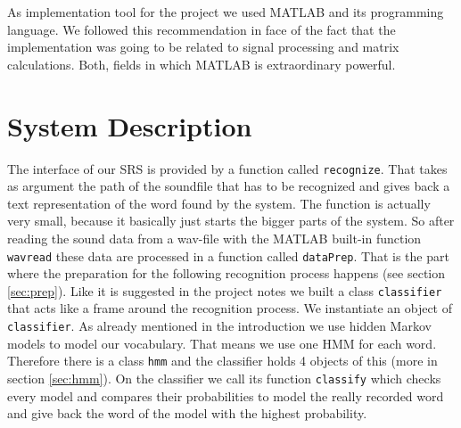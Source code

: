 \documentclass[titlepage]{article}
\begin{document}
As implementation tool for the project we used MATLAB and its programming language. We followed this recommendation in face of the fact that the implementation was going to be related to signal processing and matrix calculations. Both, fields in which MATLAB is extraordinary powerful.

\section{System Description}\label{sec:system}
The interface of our SRS is provided by a function called \lstinline&recognize&. That takes as argument the path of the soundfile that has to be recognized and gives back a text representation of the word found by the system. The function is actually very small, because it basically just starts the bigger parts of the system. So after reading the sound data from a wav-file with the MATLAB built-in function \lstinline&wavread& these data are processed in a function called \lstinline&dataPrep&. That is the part where the preparation for the following recognition process happens (see section \ref{sec:prep}).
Like it is suggested in the project notes we built a class \lstinline&classifier& that acts like a frame around the recognition process. We instantiate an object of \lstinline&classifier&. As already mentioned in the introduction we use hidden Markov models to model our vocabulary. That means we use one HMM for each word. Therefore there is a class \lstinline&hmm& and the classifier holds 4 objects of this (more in section \ref{sec:hmm}). On the classifier we call its function \lstinline&classify& which checks every model and compares their probabilities to model the really recorded word and give back the word of the model with the highest probability.

\end{document}
